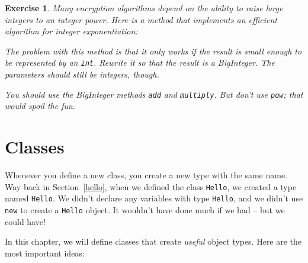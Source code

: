 \documentclass[12pt]{book}
\theoremstyle{exercise}
\newtheorem{exercise}{Exercise}[chapter]
\newcommand{\java}[1]{\verb"#1"}
\begin{document}
\begin{exercise}
Many encryption algorithms depend on the ability to raise large integers to an integer power.
Here is a method that implements an efficient algorithm for integer exponentiation:


The problem with this method is that it only works if the result is small enough to be represented by an \java{int}.
Rewrite it so that the result is a BigInteger.
The parameters should still be integers, though.

You should use the BigInteger methods \java{add} and \java{multiply}.
But don't use \java{pow}; that would spoil the fun.
\end{exercise}


\chapter{Classes}
\label{classes}


Whenever you define a new class, you create a new type with the same name.
Way back in Section~\ref{hello}, when we defined the class \java{Hello}, we created a type named \java{Hello}.
We didn't declare any variables with type \java{Hello}, and we didn't use \java{new} to create a \java{Hello} object.
It wouldn't have done much if we had -- but we could have!


In this chapter, we will define classes that create {\em useful} object types.
Here are the most important ideas:
\end{document}
